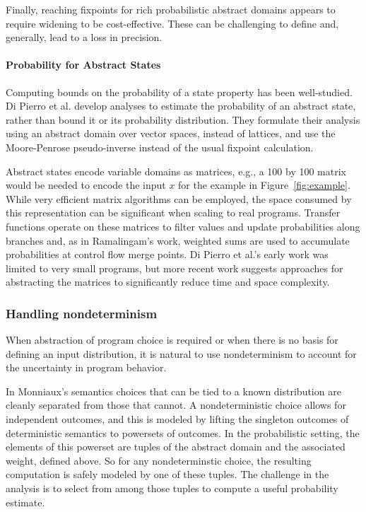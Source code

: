 Finally, reaching fixpoints for rich probabilistic abstract domains
appears to require widening \cite{monniaux2000abstract,esparza2011probabilistic} to be cost-effective.  These can be challenging to define and, generally,
lead to a loss in precision.

\paragraph{Probability for Abstract States}

Computing bounds on the probability of a state property has been well-studied.
Di Pierro et al. \cite{di2013probabilistic} develop analyses
to estimate the probability of an abstract state, 
rather than bound it or its probability distribution.  
They formulate their analysis using an abstract 
domain over vector spaces, instead of lattices, and use
the Moore-Penrose pseudo-inverse instead of the usual fixpoint calculation.

Abstract states encode variable domains as matrices, e.g., a 100 by 100 matrix
would be needed to encode the input $x$ for the example in 
Figure~\ref{fig:example}.  While very efficient matrix algorithms
can be employed, the space consumed by this representation can
be significant when scaling to real programs.
Transfer functions operate on these matrices to filter values and
update probabilities along branches and, 
as in Ramalingam's work, weighted sums are used to accumulate probabilities
at control flow merge points.
Di Pierro et al.'s early work was limited to very small 
programs, but more recent
work suggests approaches for abstracting the matrices to significantly
reduce time and space complexity.   

\subsubsection{Handling nondeterminism}
When abstraction of program choice is required or when 
there is no basis for defining an input distribution,
it is natural to use nondeterminism to account for the uncertainty
in program behavior.

In Monniaux's semantics \cite{monniaux2005abstract} choices 
that can be tied to a known
distribution are cleanly separated from those that cannot.
A nondeterministic choice allows for independent outcomes, and
this is modeled by lifting the singleton outcomes of deterministic
semantics to powersets of outcomes.
In the probabilistic setting, the elements of this powerset are
tuples of the abstract domain and the associated weight, defined
above.  So for any nondeterminstic choice, the resulting computation 
is safely modeled by one of these tuples.  The challenge in the
analysis is to select from among those tuples to compute a useful
probability estimate.

